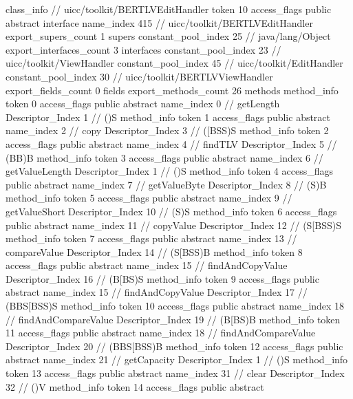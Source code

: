 {{		class_info {		// uicc/toolkit/BERTLVEditHandler
			token	10
			access_flags	public abstract interface
			name_index	415		// uicc/toolkit/BERTLVEditHandler
			export_supers_count	1
			supers {
				constant_pool_index	25		// java/lang/Object
			}
			export_interfaces_count	3
			interfaces {
				constant_pool_index	23		// uicc/toolkit/ViewHandler
				constant_pool_index	45		// uicc/toolkit/EditHandler
				constant_pool_index	30		// uicc/toolkit/BERTLVViewHandler
			}
			export_fields_count	0
			fields {
			}
			export_methods_count	26
			methods {
				method_info {
					token	0
					access_flags	public abstract
					name_index	0		// getLength
					Descriptor_Index	1		// ()S
				}
				method_info {
					token	1
					access_flags	public abstract
					name_index	2		// copy
					Descriptor_Index	3		// ([BSS)S
				}
				method_info {
					token	2
					access_flags	public abstract
					name_index	4		// findTLV
					Descriptor_Index	5		// (BB)B
				}
				method_info {
					token	3
					access_flags	public abstract
					name_index	6		// getValueLength
					Descriptor_Index	1		// ()S
				}
				method_info {
					token	4
					access_flags	public abstract
					name_index	7		// getValueByte
					Descriptor_Index	8		// (S)B
				}
				method_info {
					token	5
					access_flags	public abstract
					name_index	9		// getValueShort
					Descriptor_Index	10		// (S)S
				}
				method_info {
					token	6
					access_flags	public abstract
					name_index	11		// copyValue
					Descriptor_Index	12		// (S[BSS)S
				}
				method_info {
					token	7
					access_flags	public abstract
					name_index	13		// compareValue
					Descriptor_Index	14		// (S[BSS)B
				}
				method_info {
					token	8
					access_flags	public abstract
					name_index	15		// findAndCopyValue
					Descriptor_Index	16		// (B[BS)S
				}
				method_info {
					token	9
					access_flags	public abstract
					name_index	15		// findAndCopyValue
					Descriptor_Index	17		// (BBS[BSS)S
				}
				method_info {
					token	10
					access_flags	public abstract
					name_index	18		// findAndCompareValue
					Descriptor_Index	19		// (B[BS)B
				}
				method_info {
					token	11
					access_flags	public abstract
					name_index	18		// findAndCompareValue
					Descriptor_Index	20		// (BBS[BSS)B
				}
				method_info {
					token	12
					access_flags	public abstract
					name_index	21		// getCapacity
					Descriptor_Index	1		// ()S
				}
				method_info {
					token	13
					access_flags	public abstract
					name_index	31		// clear
					Descriptor_Index	32		// ()V
				}
				method_info {
					token	14
					access_flags	public abstract
}}}}}
